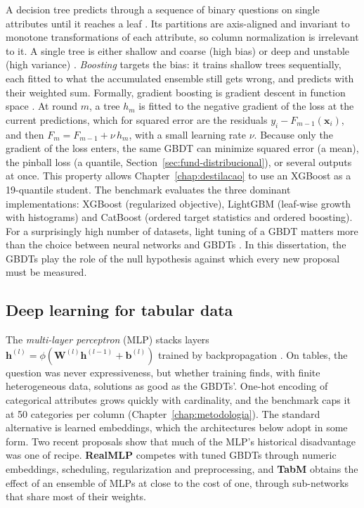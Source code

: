 A decision tree predicts through a sequence of binary questions on
single attributes until it reaches a leaf \citep{cart1984}. Its
partitions are axis-aligned and invariant to monotone transformations
of each attribute, so column normalization is irrelevant to it. A
single tree is either shallow and coarse (high bias) or deep and
unstable (high variance) \citep{hastie2009}. \emph{Boosting} targets the bias: it trains shallow trees sequentially, each fitted to what the accumulated ensemble still gets wrong, and predicts with
their weighted sum. Formally, gradient boosting is gradient descent
in function space \citep{friedman2001}. At round $m$, a tree $h_m$ is
fitted to the negative gradient of the loss at the current
predictions, which for squared error are the residuals
$y_i - F_{m-1}(\mathbf{x}_i)$, and then $F_m = F_{m-1} + \nu\, h_m$, with a small learning rate $\nu$.
Because only the gradient of the loss enters, the same GBDT can minimize squared error (a
mean), the pinball loss (a quantile,
Section~\ref{sec:fund-distribucional}), or several outputs at once.
This property allows Chapter~\ref{chap:destilacao} to use an
XGBoost as a 19-quantile student. The benchmark evaluates the three
dominant implementations: XGBoost \citep{chen2016} (regularized
objective), LightGBM \citep{ke2017} (leaf-wise growth with
histograms) and CatBoost \citep{prokhorenkova2018} (ordered target
statistics and ordered boosting). For a surprisingly high number of
datasets, light tuning of a GBDT matters more than the choice between
neural networks and GBDTs \citep{mcelfresh2023}. In this
dissertation, the GBDTs play the role of the null hypothesis against
which every new proposal must be measured.

\subsection{Deep learning for tabular data}
\label{sec:fund-dl}

The \emph{multi-layer perceptron} (MLP) stacks layers
$\mathbf{h}^{(l)} = \phi(\mathbf{W}^{(l)}\mathbf{h}^{(l-1)} +
\mathbf{b}^{(l)})$ trained by backpropagation \citep{rumelhart1986}.
On tables, the question was never expressiveness, but whether training finds, with finite heterogeneous data, solutions
as good as the GBDTs'. One-hot encoding of categorical attributes grows quickly with cardinality, and the benchmark
caps it at 50 categories per column
(Chapter~\ref{chap:metodologia}). The standard alternative is learned
embeddings, which the architectures below adopt in some form. Two
recent proposals show that much of the MLP's historical disadvantage
was one of recipe. \textbf{RealMLP} \citep{realmlp2024}
competes with tuned GBDTs through numeric embeddings, scheduling,
regularization and preprocessing, and \textbf{TabM} \citep{tabm2025}
obtains the effect of an ensemble of MLPs at close to the cost of
one, through sub-networks that share most of their weights.

